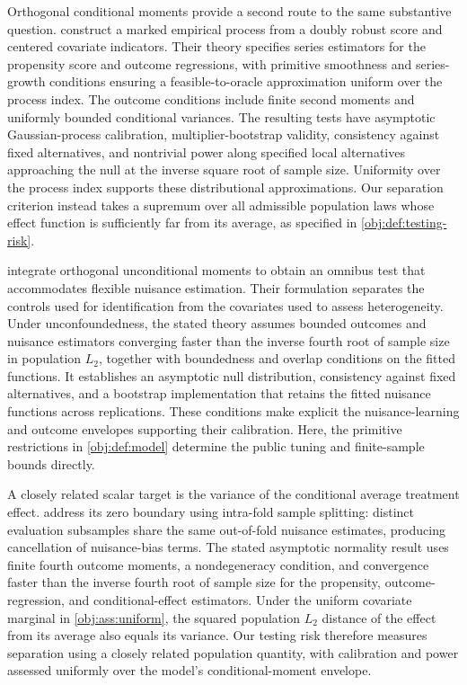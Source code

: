 \documentclass[11pt]{article}
\begin{document}
Orthogonal conditional moments provide a second route to the same substantive question. \citet[Assumptions 1--5, Proposition 2, and Theorems 3.1--3.3 and 4.1]{LuSong2026OrthogonalICM} construct a marked empirical process from a doubly robust score and centered covariate indicators. Their theory specifies series estimators for the propensity score and outcome regressions, with primitive smoothness and series-growth conditions ensuring a feasible-to-oracle approximation uniform over the process index. The outcome conditions include finite second moments and uniformly bounded conditional variances. The resulting tests have asymptotic Gaussian-process calibration, multiplier-bootstrap validity, consistency against fixed alternatives, and nontrivial power along specified local alternatives approaching the null at the inverse square root of sample size. Uniformity over the process index supports these distributional approximations. Our separation criterion instead takes a supremum over all admissible population laws whose effect function is sufficiently far from its average, as specified in \cref{obj:def:testing-risk}.

\citet[Assumptions 3.3--3.4, Proposition 3.1, and Section 3.3]{LapentaStrittmatterVergara2026Omnibus} integrate orthogonal unconditional moments to obtain an omnibus test that accommodates flexible nuisance estimation. Their formulation separates the controls used for identification from the covariates used to assess heterogeneity. Under unconfoundedness, the stated theory assumes bounded outcomes and nuisance estimators converging faster than the inverse fourth root of sample size in population \(L_2\), together with boundedness and overlap conditions on the fitted functions. It establishes an asymptotic null distribution, consistency against fixed alternatives, and a bootstrap implementation that retains the fitted nuisance functions across replications. These conditions make explicit the nuisance-learning and outcome envelopes supporting their calibration. Here, the primitive restrictions in \cref{obj:def:model} determine the public tuning and finite-sample bounds directly.

A closely related scalar target is the variance of the conditional average treatment effect. \citet[Assumptions 3--4, Algorithm 1, and Theorem 1]{Yu2026VarianceHTE} address its zero boundary using intra-fold sample splitting: distinct evaluation subsamples share the same out-of-fold nuisance estimates, producing cancellation of nuisance-bias terms. The stated asymptotic normality result uses finite fourth outcome moments, a nondegeneracy condition, and convergence faster than the inverse fourth root of sample size for the propensity, outcome-regression, and conditional-effect estimators. Under the uniform covariate marginal in \cref{obj:ass:uniform}, the squared population \(L_2\) distance of the effect from its average also equals its variance. Our testing risk therefore measures separation using a closely related population quantity, with calibration and power assessed uniformly over the model's conditional-moment envelope.
\end{document}

